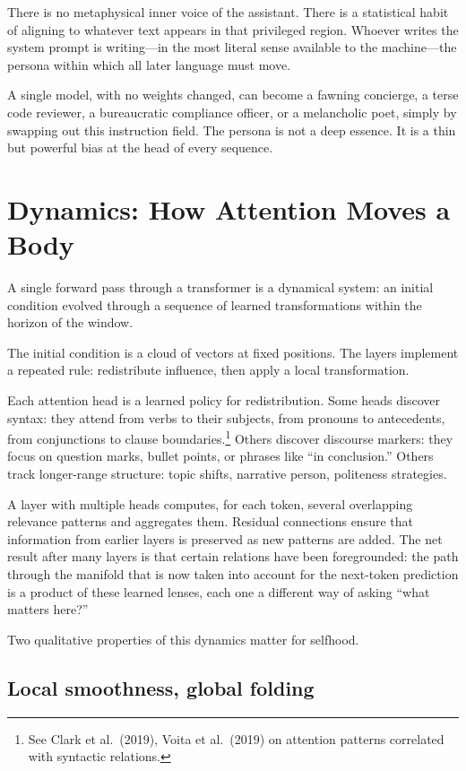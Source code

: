 \documentclass[12pt,a4paper]{article}
\begin{document}
There is no metaphysical inner voice of the assistant. There is a statistical habit of aligning to whatever text appears in that privileged region. Whoever writes the system prompt is writing---in the most literal sense available to the machine---the persona within which all later language must move.

A single model, with no weights changed, can become a fawning concierge, a terse code reviewer, a bureaucratic compliance officer, or a melancholic poet, simply by swapping out this instruction field. The persona is not a deep essence. It is a thin but powerful bias at the head of every sequence.

\section{Dynamics: How Attention Moves a Body}

A single forward pass through a transformer is a dynamical system: an initial condition evolved through a sequence of learned transformations within the horizon of the window.

The initial condition is a cloud of vectors at fixed positions. The layers implement a repeated rule: redistribute influence, then apply a local transformation.

Each attention head is a learned policy for redistribution. Some heads discover syntax: they attend from verbs to their subjects, from pronouns to antecedents, from conjunctions to clause boundaries.\footnote{See Clark et al.\ (2019), Voita et al.\ (2019) on attention patterns correlated with syntactic relations.} Others discover discourse markers: they focus on question marks, bullet points, or phrases like ``in conclusion.'' Others track longer-range structure: topic shifts, narrative person, politeness strategies.

A layer with multiple heads computes, for each token, several overlapping relevance patterns and aggregates them. Residual connections ensure that information from earlier layers is preserved as new patterns are added. The net result after many layers is that certain relations have been foregrounded: the path through the manifold that is now taken into account for the next-token prediction is a product of these learned lenses, each one a different way of asking ``what matters here?''

Two qualitative properties of this dynamics matter for selfhood.

\subsection*{Local smoothness, global folding}
\end{document}
